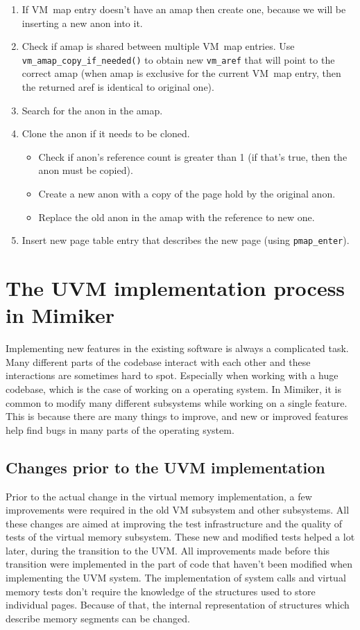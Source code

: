 \begin{enumerate}
  \item If VM~map entry doesn't have an amap then create one, because we will be inserting a new anon into it.
  \item Check if amap is shared between multiple VM~map entries.
    Use \\ \texttt{vm_amap_copy_if_needed()} to obtain new \texttt{vm_aref} that will point to the correct amap
    (when amap is exclusive for the current VM~map entry, then the returned aref is identical to original one).
  \item Search for the anon in the amap.
  \item Clone the anon if it needs to be cloned.
    \begin{itemize}
      \item Check if anon's reference count is greater than 1 (if that's true, then the anon must be copied).
      \item Create a new anon with a copy of the page hold by the original anon.
      \item Replace the old anon in the amap with the reference to new one.
    \end{itemize}
  \item Insert new page table entry that describes the new page (using \texttt{pmap_enter}).
\end{enumerate}


\section{The UVM implementation process in Mimiker}

Implementing new features in the existing software is always a complicated task.
Many different parts of the codebase interact with each other and these interactions are sometimes hard to spot.
Especially when working with a huge codebase, which is the case of working on a operating system.
In Mimiker, it is common to modify many different subsystems while working on a single feature.
This is because there are many things to improve, and new or improved features help find bugs in many parts of the operating system.

\subsection{Changes prior to the UVM implementation}

Prior to the actual change in the virtual memory implementation, a few improvements were required in the old VM subsystem and other subsystems.
All these changes are aimed at improving the test infrastructure and the quality of tests of the virtual memory subsystem.
These new and modified tests helped a lot later, during the transition to the UVM.
All improvements made before this transition were implemented in the part of code that haven't been modified when implementing the UVM system.
The implementation of system calls and virtual memory tests don't require the knowledge of the structures used to store individual pages.
Because of that, the internal representation of structures which describe memory segments can be changed.

